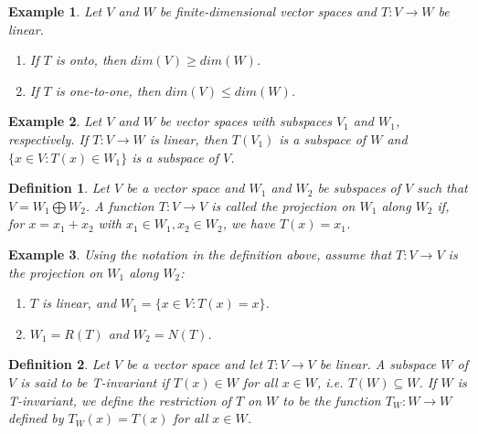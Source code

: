 \documentclass[a4paper]{article}
\newtheorem{example}{Example}
\newtheorem{mydef}{Definition}
\numberwithin{mytheorem}{section}
\numberwithin{mydef}{section}
\numberwithin{example}{section}
\begin{document}
\begin{example} Let $V$ and $W$ be finite-dimensional vector spaces and $T: V \rightarrow W$ be linear. 
\begin{enumerate}
\item If $T$ is onto, then $dim(V) \geq dim(W)$.
\item If $T$ is one-to-one, then $dim(V) \leq dim(W)$.
\end{enumerate}
\end{example}

\begin{example} Let $V$ and $W$ be vector spaces with subspaces $V_{1}$ and $W_{1}$, respectively. If $T: V \rightarrow W$ is linear, then $T(V_{1})$ is a subspace of $W$ and  $\{ x \in V: T(x) \in W_{1} \}$ is a subspace of $V$. 
\end{example}

\begin{mydef}  Let $V$ be a vector space and $W_{1}$ and $W_{2}$ be subspaces of $V$ such that $V = W_{1} \bigoplus W_{2}$. A function $T: V \rightarrow V$ is called the projection on $W_{1}$ along $W_{2}$ if, for $x = x_{1} + x_{2}$ with $x_{1} \in W_{1}, x_{2} \in W_{2}$, we have $T(x) = x_{1}$.
\end{mydef}

\begin{example} Using the notation in the definition above, assume that $T: V \rightarrow V$ is the projection on $W_{1}$ along $W_{2}$:
\begin{enumerate} 
\item $T$ is  linear, and $W_{1} = \{ x \in V : T(x) = x \}$.
\item $W_{1} = R(T)$ and $W_{2} = N(T)$.
\end{enumerate} 
\end{example}

\begin{mydef}  Let $V$ be a vector space and let $T: V \rightarrow V$ be linear. A subspace $W$ of $V$ is said to be T-invariant if $T(x) \in W$ for all $x \in W$, i.e. $T(W) \subseteq W$. If $W$ is T-invariant, we define the restriction of $T$ on $W$ to be the function $T_{W}: W \rightarrow W$ defined by $T_{W}(x) = T(x)$ for all $x \in W$. 
\end{mydef}
\end{document}
